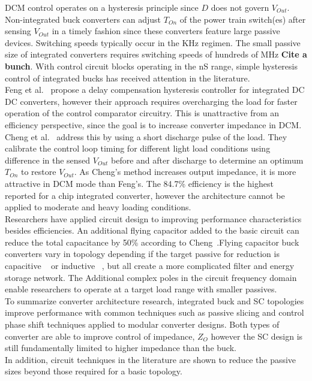 \documentclass[letterpaper,twocolumn,10pt]{article}
\begin{document}
DCM control operates on a hysteresis principle since $D$ does not govern $V_{Out}$. Non-integrated buck converters can adjust $T_{On}$ of the power train switch(es) after sensing $V_{Out}$ in a timely fashion since these converters feature large passive devices. Switching speeds typically occur in the KHz regimen. The small passive size of integrated converters requires switching speeds of hundreds of MHz \textbf{Cite a bunch}. With control circuit blocks operating in the nS range, simple hysteresis control of integrated bucks has received attention in the literature.\\
Feng et al.~\cite{Feng2008} propose a delay compensation hysteresis controller for integrated DC DC converters, however their approach requires overcharging the load for faster operation of the control comparator circuitry. This is unattractive from an efficiency perspective, since the goal is to increase converter impedance in DCM. Cheng et al. ~\cite{Cheng2013}address this by using a short discharge pulse of the load. They calibrate the control loop timing for different light load conditions using difference in the sensed $V_{Out}$ before and after discharge to determine an optimum $T_{On}$ to restore $V_{Out}$. As Cheng's method increases output impedance, it is more attractive in DCM mode than Feng's. The 84.7\% efficiency is the highest reported for a chip integrated converter, however the architecture cannot be applied to moderate and heavy loading conditions.\\  
\indent Researchers have applied circuit design to improving performance characteristics besides efficiencies. An additional flying capacitor added to the basic circuit can reduce the total capacitance by 50\% according to Cheng~\cite{ChengII2013}.Flying capacitor buck converters vary in topology depending if the target passive for reduction is capacitive ~\cite{ChengII2013} or inductive ~\cite{Kim2011}, but all create a more complicated filter and energy storage network. The Additional complex poles in the circuit frequency domain enable researchers to operate at a target load range with smaller passives.\\
\indent To summarize converter architecture research, integrated buck and SC topologies improve performance with common techniques such as passive slicing and control phase shift techniques applied to modular converter designs. Both types of converter are able to improve control of impedance, $Z_O$ however the SC design is still fundamentally limited to higher impedance than the buck.\\
In addition, circuit techniques in the literature are shown to reduce the passive sizes beyond those required for a basic topology.\\  
 
\end{document}
